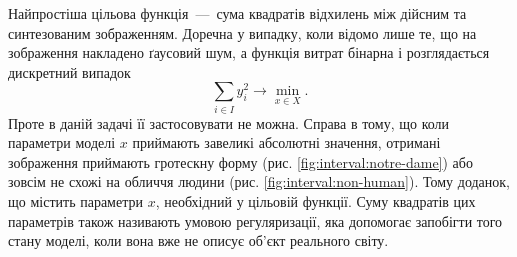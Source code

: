 Найпростіша цільова функція~---~сума квадратів відхилень
між дійсним та синтезованим зображенням.
Доречна у випадку, коли відомо лише те,
що на зображення накладено ґаусовий шум,
а функція витрат бінарна і розглядається дискретний випадок
\begin{equation*}
  \sum_{i \in I} y_i^2
  \to \min\limits_{x \in X}.
\end{equation*}
Проте в даній задачі її застосовувати не можна.
Справа в тому,
що коли параметри моделі $x$ приймають завеликі абсолютні значення,
отримані зображення приймають гротескну форму
(рис. \ref{fig:interval:notre-dame})
або зовсім не схожі на обличчя людини
(рис. \ref{fig:interval:non-human}).
Тому доданок, що містить параметри $x$, необхідний у цільовій функції.
Суму квадратів цих параметрів також називають умовою регуляризації,
яка допомогає запобігти того стану моделі,
коли вона вже не описує об'єкт реального світу.
